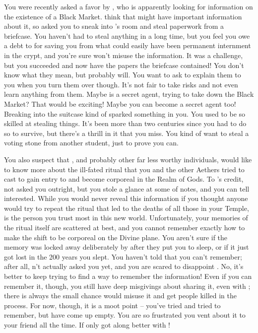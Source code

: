 \documentclass[char]{GL2020}
\begin{document}
You were recently asked a favor by \cWildCard{}, who is apparently looking for information on the existence of a Black Market. \cWildCard{\they} think\cWildCard{\plural} that \cBunker{\full} might have important information about it, so \cWildCard{\they} asked you to sneak into \cBunker{}'s room and steal paperwork from a briefcase. You haven't had to steal anything in a long time, but you feel you owe a debt to \cWildCard{} for saving you from what could easily have been permanent internment in the crypt, and you're sure \cWildCard{\they} won't misuse the information. It was a challenge, but you succeeded and now have the papers the briefcase contained! You don't know what they mean, but \cWildCard{} probably will. You want to ask \cWildCard{} to explain them to you when you turn them over though. It's not fair to take risks and not even learn anything from them. Maybe \cWildCard{} is a secret agent, trying to take down the Black Market? That would be exciting! Maybe you can become a secret agent too! Breaking into the suitcase kind of sparked something in you. You used to be so skilled at stealing things. It's been more than two centuries since you had to do so to survive, but there's a thrill in it that you miss. You kind of want to steal a voting stone from another student, just to prove you can.

You also suspect that \cWildCard{}, and probably other far less worthy individuals, would like to know more about the ill-fated ritual that you and the other Aethers tried to cast to gain entry to and become corporeal in the Realm of Gods. To \cWildCard{}'s credit, \cWildCard{\they} \cWildCard{\have} not asked you outright, but you stole a glance at some of  notes, and you can tell \cWildCard{\theyare} interested. While you would never reveal this information if you thought anyone would try to repeat the ritual that led to the deaths of all those in your Temple, \cWildCard{} is the person you trust most in this new world. Unfortunately, your memories of the ritual itself are scattered at best, and you cannot remember exactly how to make the shift to be corporeal on the Divine plane. You aren't sure if the memory was locked away deliberately by \cDisneyMentor{} after they put you to sleep, or if it just got lost in the 200 years you slept. You haven't told \cWildCard{} that you can't remember; after all, \cWildCard{\they} \cWildCard{\have}n't actually asked you yet, and you are scared to disappoint \cWildCard{\them}. No, it's better to keep trying to find a way to remember the information! Even if you can remember it, though, you still have deep misgivings about sharing it, even with \cWildCard{}; there is always the small chance \cWildCard{\they} would misuse it and get people killed in the process. For now, though, it is a moot point – you've tried and tried to remember, but have come up empty. You are so frustrated you vent about it to your friend \cTechStar{} all the time. If only \cTechStar{\they} got along better with \cWildCard{}!
\end{document}
